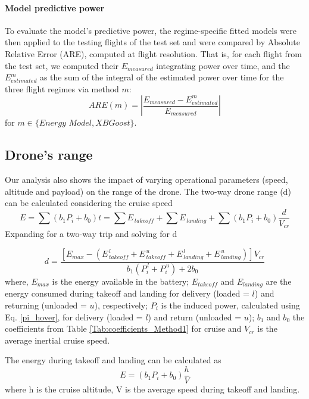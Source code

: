 \documentclass{article}
\begin{document}
\paragraph{Model predictive power} 
To evaluate the model's predictive power, the regime-specific fitted models were then applied to the testing flights of the test set and were compared by Absolute Relative Error (ARE), computed at flight resolution. That is, for each flight from the test set, we computed their $E_{measured}$ integrating power over time, and the $E_{estimated}^m$ as the sum of the integral of the estimated power over time for the three flight regimes via method $m$: 
\begin{equation}
\label{eq:relativeerror}
    ARE(m) = \left | \frac{E_{measured}-E_{estimated}^m}{E_{measured}} \right|
\end{equation}
for $m \in \{\textit{Energy Model}, \textit{XBGoost}\}. $

\subsection{Drone's range}
Our analysis also shows the impact of varying operational parameters (speed, altitude and payload) on the range of the drone. The two-way drone range (d) can be calculated considering the cruise speed
\begin{equation}
    E = \sum(b_{1}P_{i} + b_{0})t = \sum E_{\,takeoff} + \sum E_{\,landing} + \sum (b_{1}P_{i} + b_{0}) \frac{d}{V_{cr}}
\end{equation}
Expanding for a two-way trip and solving for d

\begin{equation}
    d = \frac{
    \left[E_{max} - \left(E_{\,takeoff}^{\,l} + E_{\,takeoff}^{\,u} + E_{\,landing}^{\,l} + E_{\,landing}^{\,u} \right)\right]V_{cr}}{b_{1} \left(P_{i}^{\,l}+P_{i}^{\,u}\right)  + 2b_{0} }
\end{equation}
where, $E_{max}$ is the energy available in the battery; $E_{takeoff}$ and $E_{landing}$ are the energy consumed during takeoff and landing for delivery (loaded = $l$) and returning (unloaded = $u$), respectively;  $P_{i}$ is the induced power, calculated using Eq. \ref{pi_hover}, for delivery (loaded = $l$) and return (unloaded = $u$); $b_{1}$ and $b_{0}$ the coefficients from Table \ref{Tab:coefficients_Method1} for cruise and $V_{cr}$ is the average inertial cruise speed.

The energy during takeoff and landing can be calculated as
\begin{equation}
    E = \left(b_{1}P_{i} + b_{0}\right)\frac{h}{V}
\end{equation}
where h is the cruise altitude, V is the average speed during takeoff and landing. 
\end{document}
